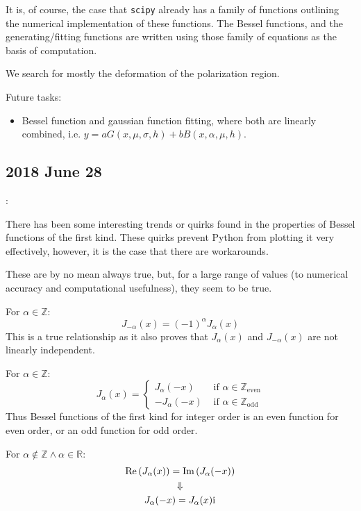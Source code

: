 \documentclass[twocolumn]{article}
\begin{document}
It is, of course, the case that \texttt{scipy} already has a family of functions outlining the numerical implementation of these functions. The Bessel functions, and the generating/fitting functions are written using those family of equations as the basis of computation. 


\begin{meetingnotes*}
	We search for mostly the deformation of the polarization region. 

	Future tasks:
	\begin{itemize}
		\item Bessel function and gaussian function fitting, where both are linearly combined, i.e. $y = a G(x,\mu,\sigma,h) + b B(x,\alpha,\mu,h)$.
	\end{itemize}
\end{meetingnotes*}


\subsection{2018 June 28}:
\label{subsec:2018_June_28}

There has been some interesting trends or quirks found in the properties of Bessel functions of the first kind. These quirks prevent Python from plotting it very effectively, however, it is the case that there are workarounds.

These are by no mean always true, but, for a large range of values (to numerical accuracy and computational usefulness), they seem to be true.

For $\alpha \in \mathbb{Z}$:
\begin{equation*}
	J_{-\alpha} (x) = \left( -1 \right)^{\alpha} J_{\alpha}(x)
\end{equation*}
This is a true relationship as it also proves that $J_{\alpha} (x)$ and $J_{-\alpha} (x)$ are not linearly independent.

For $\alpha \in \mathbb{Z}$:
\begin{equation*}
	J_\alpha (x) = 
	\begin{cases}
	J_\alpha (-x) & \text{ if } \alpha \in \mathbb{Z}_\text{even} \\ 
	-J_\alpha (-x) & \text{ if } \alpha \in \mathbb{Z}_\text{odd} 
	\end{cases}
\end{equation*}
Thus Bessel functions of the first kind for integer order is an even function for even order, or an odd function for odd order.

For $\alpha \notin \mathbb{Z} \land \alpha \in \mathbb{R}$:
\begin{gather*}
	\text{Re}\left( J_\alpha (x) \right) = \text{Im}\left( J_\alpha (-x) \right) \\
	\Downarrow \\
	J_\alpha (-x) = J_\alpha (x) \mathrm{i}\mkern1mu
\end{gather*}
\end{document}
